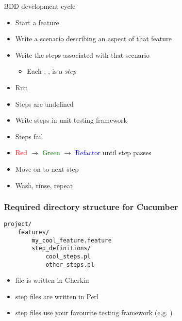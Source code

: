 \documentclass[10pt]{vcs_beamer}
\newcommand{\Given}{\color{DarkOrange}{Given}}
\newcommand{\When}{\color{RoyalBlue}{When}}
\newcommand{\Then}{\color{ForestGreen}{Then}}
\begin{document}
\begin{frame}{BDD development cycle}
    \begin{itemize}
        \item Start a feature
        \item Write a scenario describing an aspect of that feature
        \item Write the steps associated with that scenario
            \begin{itemize}
                \item Each \ttt{\Given}, \ttt{\When}, \ttt{\Then} is a \emph{step}
            \end{itemize}
        \item Run 
        \item Steps are undefined
        \item Write steps in unit-testing framework
        \item Steps fail
        \item \textcolor{red}{Red} $\rightarrow$ \textcolor{green}{Green}
            $\rightarrow$ \textcolor{blue}{Refactor} until step passes
        \item Move on to next step
        \item Wash, rinse, repeat
    \end{itemize}
\end{frame}

\begin{frame}[fragile]
\frametitle{Required directory structure for Cucumber}

\begin{lstlisting}
project/
    features/
        my_cool_feature.feature
        step_definitions/
            cool_steps.pl
            other_steps.pl
\end{lstlisting}

\begin{itemize}
    \item {} file is written in Gherkin
    \item step files are written in Perl
    \item step files use your favourite testing framework (e.g.
        )
\end{itemize}

\end{frame}
\end{document}
